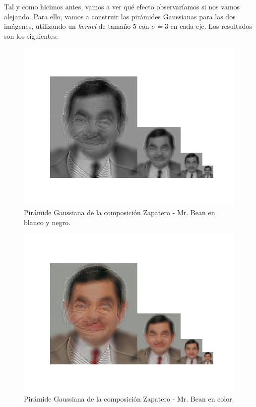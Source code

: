 \documentclass[11pt,a4paper]{article}
\begin{document}
Tal y como hicimos antes, vamos a ver qué efecto observaríamos si nos vamos alejando. Para ello, vamos a construir las pirámides
Gaussianas para las dos imágenes, utilizando un \textit{kernel} de tamaño 5 con $\sigma=3$ en cada eje. Los resultados son los
siguientes:

\begin{figure}[H]
\centering
\includegraphics[scale=0.7]{img/zapabean-pyr1.png}
\caption{Pirámide Gaussiana de la composición Zapatero - Mr. Bean en blanco y negro.}
\label{fig:zapabean-pyr1}
\end{figure}

\begin{figure}[H]
\centering
\includegraphics[scale=0.7]{img/zapabean-pyr2.png}
\caption{Pirámide Gaussiana de la composición Zapatero - Mr. Bean en color.}
\label{fig:zapabean-pyr2}
\end{figure}
\end{document}
